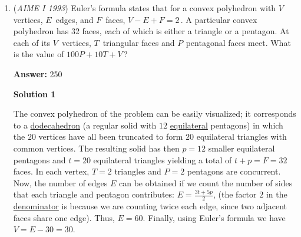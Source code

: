 \begin{enumerate}
 



\textbf{Solution 2}

Two labels $a$ and $b$ occur on the same point if $\ a(a+1)/2\equiv \ b(b+1)/2\pmod{2000}$. If we assume the final answer be $n$, then we have $\frac12(n)(n + 1)\equiv \frac12(1993)(1994) \pmod{2000}$.

 Multiply $2$ on both side we have $(1993)(1994) - (n)(n + 1) = (1993 - n)(1994 + n)\equiv 0\pmod{4000}$. As they have different parities, the even one must be divisible by $32$. As $(1993 - n)+(1994 + n)\equiv 2\pmod{5}$, one of them is divisible by $5$, which indicates it's divisible by $125$.

 Which leads to four different cases: $1993-n\equiv 0\pmod{4000}$ ; $1994+n\equiv 0\pmod{4000}$ ; $1993-n\equiv 0\pmod{32}$ and $1994+n\equiv 0\pmod{125}$ ; $1993-n\equiv 0\pmod{125}$ and $1994+n\equiv 0\pmod{32}$. Which leads to $n\equiv 1993,2006,3881$ and $118\pmod{4000}$ respectively, and only $n=118$ satisfied.Therefore answer is $\boxed{118}$.(by ZJY)

 


	\item (\textit{AIME I 1993}) Euler's formula states that for a convex polyhedron with $V\,$ vertices, $E\,$ edges, and $F\,$ faces, $V-E+F=2\,$. A particular convex polyhedron has 32 faces, each of which is either a triangle or a pentagon. At each of its $V\,$ vertices, $T\,$ triangular faces and $P^{}_{}$ pentagonal faces meet. What is the value of $100P+10T+V\,$? 


 
 \textbf{Answer: }250



\textbf{Solution 1}

The convex polyhedron of the problem can be easily visualized; it corresponds to a \href{https://artofproblemsolving.com/wiki/index.php?title=Dodecahedron}{dodecahedron} (a regular solid with $12$ \href{https://artofproblemsolving.com/wiki/index.php?title=Equilateral}{equilateral} pentagons) in which the $20$ vertices have all been truncated to form $20$ equilateral triangles with common vertices. The resulting solid has then $p=12$ smaller equilateral pentagons and $t=20$ equilateral triangles yielding a total of $t+p=F=32$ faces. In each vertex, $T=2$ triangles and $P=2$ pentagons are concurrent. Now, the number of edges $E$ can be obtained if we count the number of sides that each triangle and pentagon contributes: $E=\frac{3t+5p}{2}$, (the factor $2$ in the \href{https://artofproblemsolving.com/wiki/index.php?title=Denominator}{denominator} is because we are counting twice each edge, since two adjacent faces share one edge). Thus, $E=60$. Finally, using Euler's formula we have $V=E-30=30$.


\end{enumerate}
